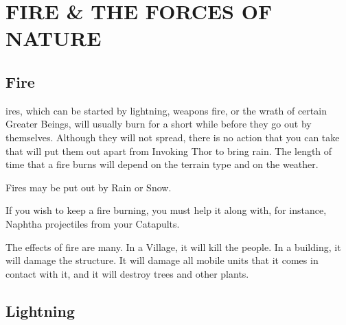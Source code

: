 
\chapter[Fire and the Forces of Nature]{{\Huge F}IRE {\Huge \&} THE {\Huge F}ORCES OF {\Huge N}ATURE}

\section{\textsf{Fire}}


ires, which can be started by lightning, weapons fire, or the wrath of certain Greater Beings, will usually burn for a short while before they go out by themselves. Although they will not spread, there is no action that you can take that will put them out apart from Invoking Thor to bring rain. The length of time that a fire burns will depend on the terrain type and on the weather.

Fires may be put out by Rain or Snow.

If you wish to keep a fire burning, you must help it along with, for instance, Naphtha projectiles from your Catapults.

The effects of fire are many. In a Village, it will kill the people. In a building, it will damage the structure. It will damage all mobile units that it comes in contact with it, and it will destroy trees and other plants.

\section{\textsf{Lightning}}


